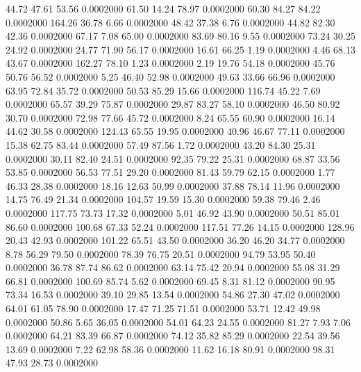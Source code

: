   44.72   47.61   53.56   0.0002000
  61.50   14.24   78.97   0.0002000
  60.30   84.27   84.22   0.0002000
 164.26   36.78    6.66   0.0002000
  48.42   37.38    6.76   0.0002000
  44.82   82.30   42.36   0.0002000
  67.17    7.08   65.00   0.0002000
  83.69   80.16    9.55   0.0002000
  73.24   30.25   24.92   0.0002000
  24.77   71.90   56.17   0.0002000
  16.61   66.25    1.19   0.0002000
   4.46   68.13   43.67   0.0002000
 162.27   78.10    1.23   0.0002000
   2.19   19.76   54.18   0.0002000
  45.76   50.76   56.52   0.0002000
   5.25   46.40   52.98   0.0002000
  49.63   33.66   66.96   0.0002000
  63.95   72.84   35.72   0.0002000
  50.53   85.29   15.66   0.0002000
 116.74   45.22    7.69   0.0002000
  65.57   39.29   75.87   0.0002000
  29.87   83.27   58.10   0.0002000
  46.50   80.92   30.70   0.0002000
  72.98   77.66   45.72   0.0002000
   8.24   65.55   60.90   0.0002000
  16.14   44.62   30.58   0.0002000
 124.43   65.55   19.95   0.0002000
  40.96   46.67   77.11   0.0002000
  15.38   62.75   83.44   0.0002000
  57.49   87.56    1.72   0.0002000
  43.20   84.30   25.31   0.0002000
  30.11   82.40   24.51   0.0002000
  92.35   79.22   25.31   0.0002000
  68.87   33.56   53.85   0.0002000
  56.53   77.51   29.20   0.0002000
  81.43   59.79   62.15   0.0002000
   1.77   46.33   28.38   0.0002000
  18.16   12.63   50.99   0.0002000
  37.88   78.14   11.96   0.0002000
  14.75   76.49   21.34   0.0002000
 104.57   19.59   15.30   0.0002000
  59.38   79.46    2.46   0.0002000
 117.75   73.73   17.32   0.0002000
   5.01   46.92   43.90   0.0002000
  50.51   85.01   86.60   0.0002000
 100.68   67.33   52.24   0.0002000
 117.51   77.26   14.15   0.0002000
 128.96   20.43   42.93   0.0002000
 101.22   65.51   43.50   0.0002000
  36.20   46.20   34.77   0.0002000
   8.78   56.29   79.50   0.0002000
  78.39   76.75   20.51   0.0002000
  94.79   53.95   50.40   0.0002000
  36.78   87.74   86.62   0.0002000
  63.14   75.42   20.94   0.0002000
  55.08   31.29   66.81   0.0002000
 100.69   85.74    5.62   0.0002000
  69.45    8.31   81.12   0.0002000
  90.95   73.34   16.53   0.0002000
  39.10   29.85   13.54   0.0002000
  54.86   27.30   47.02   0.0002000
  64.01   61.05   78.90   0.0002000
  17.47   71.25   71.51   0.0002000
  53.71   12.42   49.98   0.0002000
  50.86    5.65   36.05   0.0002000
  54.01   64.23   24.55   0.0002000
  81.27    7.93    7.06   0.0002000
  64.21   83.39   66.87   0.0002000
  74.12   35.82   85.29   0.0002000
  22.54   39.56   13.69   0.0002000
   7.22   62.98   58.36   0.0002000
  11.62   16.18   80.91   0.0002000
  98.31   47.93   28.73   0.0002000
